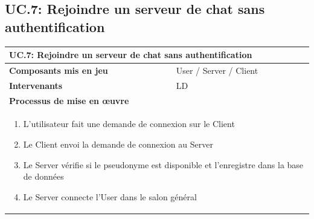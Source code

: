 \documentclass[a4paper,11pt,french]{article}
\begin{document}
\subsection{UC.7: Rejoindre un serveur de chat sans authentification}
\begin{center}
	\vspace*{0.7cm}
	\begin{tabularx}{16cm}{|l|X|}
	\hline
	\multicolumn{2}{|l|}{\textbf{UC.7: Rejoindre un serveur de chat sans authentification}}\\
	\hline
	\textbf{Composants mis en jeu} & User / Server / Client \\
	\hline
	\textbf{Intervenants} & LD \\
	\hline
	\multicolumn{2}{|l|}{\textbf{Processus de mise en \oe uvre}}\\
	\hline
	\multicolumn{2}{|p{15cm}|}{\begin{enumerate}\item L'utilisateur fait une demande de connexion sur le Client \item Le Client envoi la demande de connexion au Server \item Le Server vérifie si le pseudonyme est disponible et l'enregistre dans la base de données \item Le Server connecte l'User dans le salon général\end{enumerate}}\\
	\hline
	\end{tabularx}
\end{center}
\end{document}
